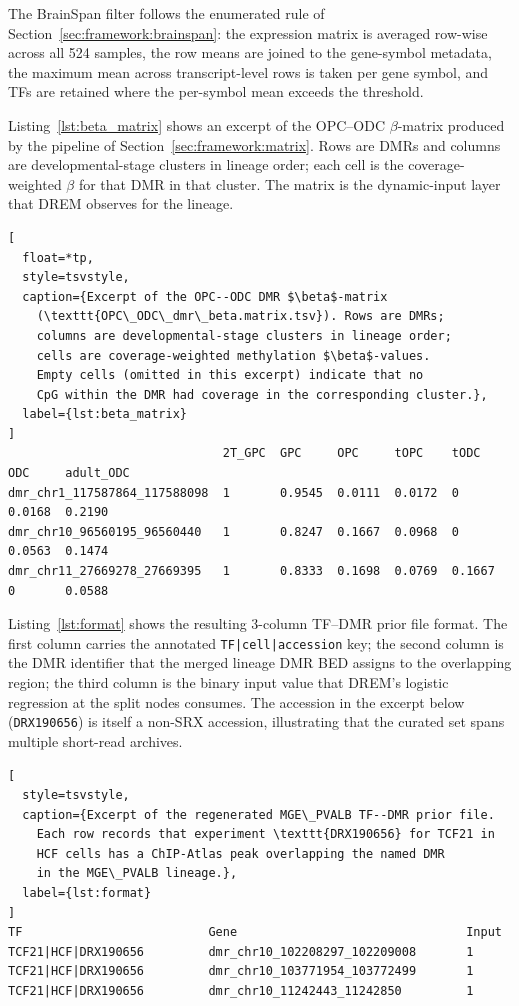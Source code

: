 \documentclass[sigconf,nonacm]{acmart}
\begin{document}
The BrainSpan filter follows the enumerated rule of
Section~\ref{sec:framework:brainspan}: the expression matrix is
averaged row-wise across all 524 samples, the row means are joined to
the gene-symbol metadata, the maximum mean across transcript-level
rows is taken per gene symbol, and TFs are retained where the
per-symbol mean exceeds the threshold.

Listing~\ref{lst:beta_matrix} shows an excerpt of the OPC--ODC
$\beta$-matrix produced by the pipeline of
Section~\ref{sec:framework:matrix}. Rows are DMRs and columns are
developmental-stage clusters in lineage order; each cell is the
coverage-weighted $\beta$ for that DMR in that cluster. The matrix
is the dynamic-input layer that DREM observes for the lineage.

\begin{lstlisting}[
  float=*tp,
  style=tsvstyle,
  caption={Excerpt of the OPC--ODC DMR $\beta$-matrix
    (\texttt{OPC\_ODC\_dmr\_beta.matrix.tsv}). Rows are DMRs;
    columns are developmental-stage clusters in lineage order;
    cells are coverage-weighted methylation $\beta$-values.
    Empty cells (omitted in this excerpt) indicate that no
    CpG within the DMR had coverage in the corresponding cluster.},
  label={lst:beta_matrix}
]
                              2T_GPC  GPC     OPC     tOPC    tODC    ODC     adult_ODC
dmr_chr1_117587864_117588098  1       0.9545  0.0111  0.0172  0       0.0168  0.2190
dmr_chr10_96560195_96560440   1       0.8247  0.1667  0.0968  0       0.0563  0.1474
dmr_chr11_27669278_27669395   1       0.8333  0.1698  0.0769  0.1667  0       0.0588
\end{lstlisting}

Listing~\ref{lst:format} shows the resulting 3-column TF--DMR prior
file format. The first column carries the annotated
\texttt{TF|cell|accession} key; the second column is the DMR
identifier that the merged lineage DMR BED assigns to the
overlapping region; the third column is the binary input value that
DREM's logistic regression at the split nodes consumes. The
accession in the excerpt below (\texttt{DRX190656}) is itself a
non-SRX accession, illustrating that the curated set spans multiple
short-read archives.

\begin{lstlisting}[
  style=tsvstyle,
  caption={Excerpt of the regenerated MGE\_PVALB TF--DMR prior file.
    Each row records that experiment \texttt{DRX190656} for TCF21 in
    HCF cells has a ChIP-Atlas peak overlapping the named DMR
    in the MGE\_PVALB lineage.},
  label={lst:format}
]
TF                          Gene                                Input
TCF21|HCF|DRX190656         dmr_chr10_102208297_102209008       1
TCF21|HCF|DRX190656         dmr_chr10_103771954_103772499       1
TCF21|HCF|DRX190656         dmr_chr10_11242443_11242850         1
\end{lstlisting}
\end{document}
